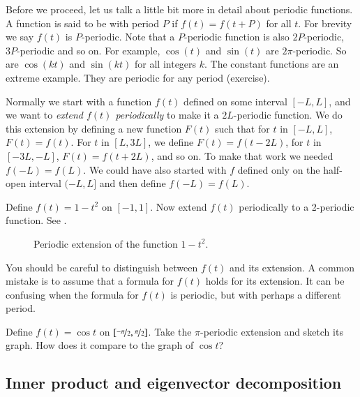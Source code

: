 Before we proceed, let us talk a little bit more in detail about
periodic functions.
A function is said to be \emph{} with period $P$ if
$f(t) = f(t+P)$ for all $t$.  For brevity we say $f(t)$ is $P$-periodic.
Note that a $P$-periodic function is also $2P$-periodic, $3P$-periodic
and so on.
For example, $\cos (t)$ and $\sin (t)$ are
$2\pi$-periodic.  So are $\cos (kt)$ and $\sin (kt)$ for all integers $k$.  The
constant functions are an extreme example.  They are periodic for any period
(exercise).

Normally we start with a function $f(t)$ defined on some interval $[-L,L]$,
and we want to
\emph{extend $f(t)$ periodically}
to make it
a $2L$-periodic function.  We do this extension
by defining a new function $F(t)$
such that for $t$ in $[-L,L]$, $F(t) = f(t)$.  For $t$ in $[L,3L]$,
we define $F(t) = f(t-2L)$, for $t$ in $[-3L,-L]$, $F(t) = f(t+2L)$, and
so on.
To make that work we needed $f(-L) = f(L)$.
We could have also started with $f$
defined only on the half-open interval $(-L,L]$ and then define $f(-L) = f(L)$.

\begin{example}
Define $f(t) = 1-t^2$ on $[-1,1]$.  Now extend $f(t)$ periodically to
a 2-periodic function.  See .
\begin{figure}[h!t]
\capstart
\begin{center}
\caption{Periodic extension of the function
$1-t^2$.\label{ts:perextofinvertedparabolafig}}
\end{center}
\end{figure}
\end{example}

You should be careful to distinguish between $f(t)$ and its extension.  A common
mistake is to assume that a formula for $f(t)$ holds for its extension.  It
can be confusing when the formula for $f(t)$ is periodic, but with perhaps
a different period.

\begin{exercise}
Define $f(t) = \cos t$ on $[\nicefrac{-\pi}{2},\nicefrac{\pi}{2}]$.  Take the $\pi$-periodic
extension and sketch its graph.  How does it compare to the graph of
$\cos t$?
\end{exercise}

\subsection{Inner product and eigenvector decomposition}

